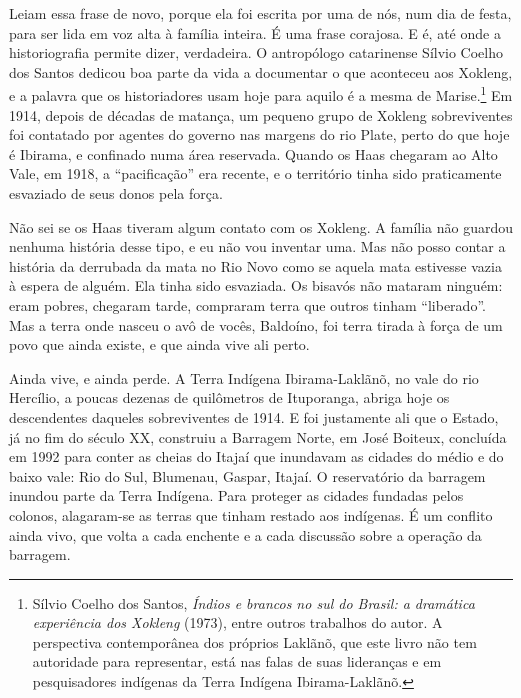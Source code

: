 \documentclass[
  brazilian,
  11pt,
  openany]{book}
\begin{document}
Leiam essa frase de novo, porque ela foi escrita por uma de nós, num dia
de festa, para ser lida em voz alta à família inteira. É uma frase
corajosa. E é, até onde a historiografia permite dizer, verdadeira. O
antropólogo catarinense Sílvio Coelho dos Santos dedicou boa parte da
vida a documentar o que aconteceu aos Xokleng, e a palavra que os
historiadores usam hoje para aquilo é a mesma de Marise.\footnote{Sílvio
  Coelho dos Santos, \emph{Índios e brancos no sul do Brasil: a
  dramática experiência dos Xokleng} (1973), entre outros trabalhos do
  autor. A perspectiva contemporânea dos próprios Laklãnõ, que este
  livro não tem autoridade para representar, está nas falas de suas
  lideranças e em pesquisadores indígenas da Terra Indígena
  Ibirama-Laklãnõ.} Em 1914, depois de décadas de matança, um pequeno
grupo de Xokleng sobreviventes foi contatado por agentes do governo nas
margens do rio Plate, perto do que hoje é Ibirama, e confinado numa área
reservada. Quando os Haas chegaram ao Alto Vale, em 1918, a
``pacificação'' era recente, e o território tinha sido praticamente
esvaziado de seus donos pela força.

Não sei se os Haas tiveram algum contato com os Xokleng. A família não
guardou nenhuma história desse tipo, e eu não vou inventar uma. Mas não
posso contar a história da derrubada da mata no Rio Novo como se aquela
mata estivesse vazia à espera de alguém. Ela tinha sido esvaziada. Os
bisavós não mataram ninguém: eram pobres, chegaram tarde, compraram
terra que outros tinham ``liberado''. Mas a terra onde nasceu o avô de
vocês, Baldoíno, foi terra tirada à força de um povo que ainda existe, e
que ainda vive ali perto.

Ainda vive, e ainda perde. A Terra Indígena Ibirama-Laklãnõ, no vale do
rio Hercílio, a poucas dezenas de quilômetros de Ituporanga, abriga hoje
os descendentes daqueles sobreviventes de 1914. E foi justamente ali que
o Estado, já no fim do século XX, construiu a Barragem Norte, em José
Boiteux, concluída em 1992 para conter as cheias do Itajaí que inundavam
as cidades do médio e do baixo vale: Rio do Sul, Blumenau, Gaspar,
Itajaí. O reservatório da barragem inundou parte da Terra Indígena. Para
proteger as cidades fundadas pelos colonos, alagaram-se as terras que
tinham restado aos indígenas. É um conflito ainda vivo, que volta a cada
enchente e a cada discussão sobre a operação da barragem.
\end{document}
